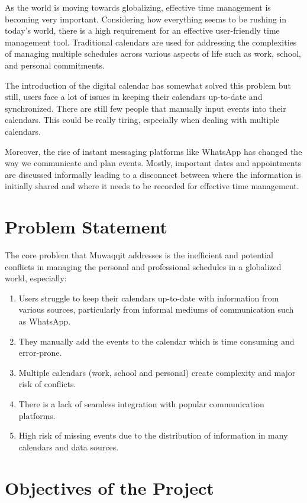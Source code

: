 \documentclass[12pt,a4paper]{article}
\begin{document}
As the world is moving towards globalizing, effective time management is becoming very important. Considering how everything seems to be rushing in today's world, there is a high requirement for an effective user-friendly time management tool. Traditional calendars are used for addressing the complexities of managing multiple schedules across various aspects of life such as work, school, and personal commitments.

The introduction of the digital calendar has somewhat solved this problem but still, users face a lot of issues in keeping their calendars up-to-date and synchronized. There are still few people that manually input events into their calendars. This could be really tiring, especially when dealing with multiple calendars.

Moreover, the rise of instant messaging platforms like WhatsApp has changed the way we communicate and plan events. Mostly, important dates and appointments are discussed informally leading to a disconnect between where the information is initially shared and where it needs to be recorded for effective time management. 

\section{Problem Statement}

The core problem that Muwaqqit addresses is the inefficient and potential conflicts in managing the personal and professional schedules in a globalized world, especially:

\begin{enumerate}
    \item Users struggle to keep their calendars up-to-date with information from various sources, particularly from informal mediums of communication such as WhatsApp.
    \item They manually add the events to the calendar which is time consuming and error-prone.
    \item Multiple calendars (work, school and personal) create complexity and major risk of conflicts.
    \item There is a lack of seamless integration with popular communication platforms.
    \item High risk of missing events due to the distribution of information in many calendars and data sources.
\end{enumerate}

\section{Objectives of the Project}
\end{document}
